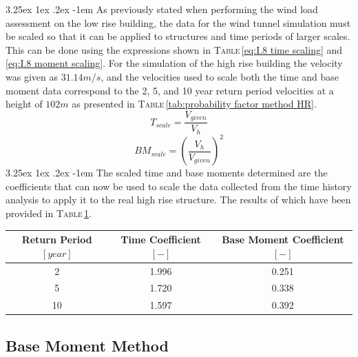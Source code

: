 \documentclass[11pt,a4paper,titlepage]{report}
\makeatletter
\renewcommand\paragraph{\@startsection{paragraph}{5}{\z@}%
  {3.25ex \@plus1ex \@minus.2ex}%
  {-1em}%
  {\normalfont\normalsize\bfseries}}
\makeatother
\begin{document}
\paragraph{}As previously stated when performing the wind load assessment on the low rise building, the data for the wind tunnel simulation must be scaled so that it can be applied to structures and time periods of larger scales. This can be done using the expressions shown in \textsc{Table}\,\ref{eq:I.8 time scaling} and \ref{eq:I.8 moment scaling}. For the simulation of the high rise building the velocity was given as $31.14m/s$, and the velocities used to scale both the time and base moment data correspond to the 2, 5, and 10 year return period velocities at a height of $102m$ as presented in \textsc{Table}\,\ref{tab:probability factor method HR}. 
\begin{equation}
    T_{scale}=\dfrac{V_{given}}{V_{h}}
    \label{eq:I.8 time scaling}
\end{equation}
\begin{equation}
    BM_{scale}=\left(\dfrac{V_{h}}{V_{given}}\right)^2
    \label{eq:I.8 moment scaling}
\end{equation}
\paragraph{}The scaled time and base moments determined are the coefficients that can now be used to scale the data collected from the time history analysis to apply it to the real high rise structure. The results of which have been provided in \textsc{Table}\,\ref{tab: scaled T and BM coefficients}.
\begin{table}[h]
\centering
\begin{tabular}{c|c|c}
Return Period $[year]$ & Time Coefficient $[-]$ & Base Moment Coefficient $[-]$ \\
\hline
2  & 1.996 & 0.251 \\
5  & 1.720 & 0.338 \\
10 & 1.597 & 0.392
\end{tabular}
\label{tab: scaled T and BM coefficients}
\end{table}
\subsection{Base Moment Method}
\end{document}
